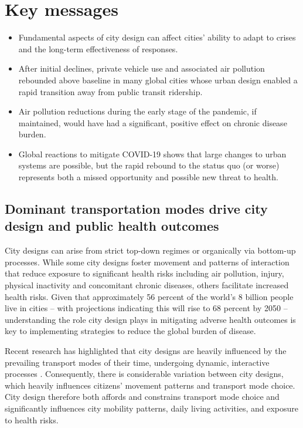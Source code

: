 \documentclass[preprint,10pt]{elsarticle} %
\begin{document}
\section*{Key messages}
\begin{itemize}
    \item[]  Fundamental aspects of city design can affect cities' ability to adapt to crises and the long-term effectiveness of responses.
    \item[] After initial declines, private vehicle use and associated air pollution rebounded above baseline in many global cities whose urban design enabled a rapid transition away from public transit ridership.
    \item[] Air pollution reductions during the early stage of the pandemic, if maintained, would have had a significant, positive effect on chronic disease burden. 
    \item[] Global reactions to mitigate COVID-19 shows that large changes to urban systems are possible, but the rapid rebound to the status quo (or worse) represents both a missed opportunity and possible new threat to health.
\end{itemize}



\subsection*{Dominant transportation modes drive city design and public health outcomes}
City designs can arise from strict top-down regimes\cite{mundigo1977city} or organically via bottom-up processes\cite{batty2017thinking, dovey2023atlas}. While some city designs foster movement and patterns of interaction that reduce exposure to significant health risks including air pollution, injury, physical inactivity and concomitant chronic diseases, others facilitate increased health risks\cite{Wijnands2022, Stevenson2016,wang2023flood, stanley2022managing}. Given that approximately 56 percent of the world's 8 billion people live in cities -- with projections indicating this will rise to 68 percent by 2050\cite{WHO2023} -- understanding the role city design plays in mitigating adverse health outcomes is key to implementing strategies to reduce the global burden of disease. 

Recent research has highlighted that city designs are heavily influenced by the prevailing transport modes of their time\cite{KNOWLES2020102607}, undergoing dynamic, interactive processes \cite{Strano2012}. Consequently, there is considerable variation between city designs, which heavily influences citizens' movement patterns and transport mode choice\cite{Thompson2020}. City design therefore both affords and constrains transport mode choice and significantly influences city mobility patterns, daily living activities, and exposure to health risks\cite{WHO2023}.
\end{document}
